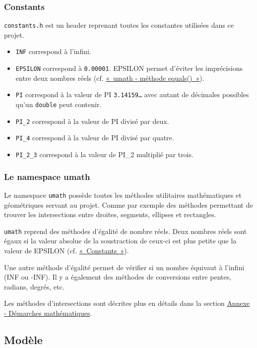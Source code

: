 \documentclass[]{report}
\begin{document}
\subsubsection{\label{Constants}Constants}

\texttt{constants.h} est un header reprenant toutes les constantes utilisées
dans ce projet. 

\begin{itemize}
    \item \texttt{INF} correspond à l'infini.
    \item \texttt{EPSILON} correspond à \texttt{0.00001}. EPSILON permet
        d'éviter les imprécisions entre deux nombres réels (cf. \hyperref[equals]{«~umath - méthode equals()~»}).
    \item \texttt{PI} correspond à la valeur de PI \texttt{3.14159\dots} avec
        autant de décimales possibles qu'un \texttt{double} peut contenir.
    \item \texttt{PI\_2} correspond à la valeur de PI divisé par deux.
    \item \texttt{PI\_4} correspond à la valeur de PI divisé par quatre.
    \item \texttt{PI\_2\_3} correspond à la valeur de PI\_2 multiplié par trois.
\end{itemize}

\subsubsection{Le namespace umath}

Le namespace \texttt{umath} possède toutes les méthodes utilitaires mathématiques
et géométriques servant au projet. Comme par exemple des méthodes permettant de trouver
les intersections entre droites, segments, ellipses et rectangles.

\label{equals}
\texttt{umath} reprend des méthodes d'égalité de nombre réels. Deux nombres réels sont égaux
si la valeur absolue de la soustraction de ceux-ci est plus petite que la valeur de EPSILON (cf. \hyperref[Constants]{«~Constants~»}).


Une autre méthode d’égalité permet de vérifier si un nombre équivaut à l’infini (INF ou -INF).
Il y a également des méthodes de conversions entre pentes, radians, degrés, etc.

Les méthodes d’intersections sont décrites plus en détails dans la section \hyperref[Annexe]{Annexe - Démarches mathématiques}.

\subsection{Modèle}
\end{document}
